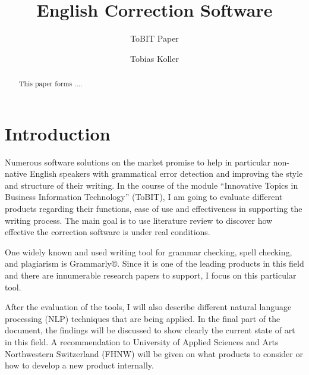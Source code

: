 \documentclass[runningheads]{llncs}
\begin{document}
\title{English Correction Software}
\subtitle{ToBIT Paper}

\author{Tobias Koller}



\maketitle              %


\begin{abstract}
This paper forms ....

\end{abstract}



\section{Introduction}
Numerous software solutions on the market promise to help in particular non-native English speakers with grammatical error detection and improving the style and structure of their writing. In the course of the module ``Innovative Topics in Business Information Technology'' (ToBIT), I am going to evaluate different products regarding their functions, ease of use and effectiveness in supporting the writing process. The main goal is to use literature review to discover how effective the correction software is under real conditions.

One widely known and used writing tool for grammar checking, spell checking, and plagiarism is Grammarly®. Since it is one of the leading products in this field and there are innumerable research papers to support, I focus on this particular tool.

After the evaluation of the tools, I will also describe different natural language processing (NLP) techniques that are being applied. In the final part of the document, the findings will be discussed to show clearly the current state of art in this field. A recommendation to University of Applied Sciences and Arts Northwestern Switzerland (FHNW) will be given on what products to consider or how to develop a new product internally.

\end{document}
